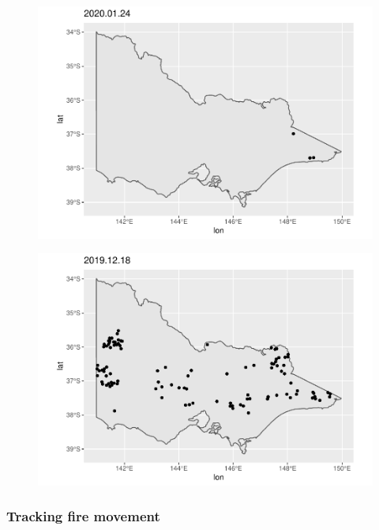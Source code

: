 \begin{Schunk}
\begin{figure}

{\centering \includegraphics[width=0.8\linewidth]{clustering_paper_files/figure-latex/app2-1} 

}

\end{figure}
\end{Schunk}

\begin{Schunk}
\begin{figure}

{\centering \includegraphics[width=0.8\linewidth]{clustering_paper_files/figure-latex/app3-1} 

}

\end{figure}
\end{Schunk}

\hypertarget{tracking-fire-movement}{%
\subsubsection{Tracking fire movement}\label{tracking-fire-movement}}

